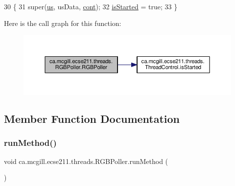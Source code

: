 \begin{DoxyCode}
30                                                                                                      \{
31     super(\hyperlink{classca_1_1mcgill_1_1ecse211_1_1threads_1_1_light_poller_ab6a9cb770bbf71f586697633db1475ff}{us}, usData, \hyperlink{classca_1_1mcgill_1_1ecse211_1_1threads_1_1_light_poller_ab6a9050ced4f6940add4735c8872194a}{cont});
32     \hyperlink{classca_1_1mcgill_1_1ecse211_1_1threads_1_1_thread_control_a92f4933511db42476e39956246bcf2fe}{isStarted} = \textcolor{keyword}{true};
33   \}
\end{DoxyCode}
Here is the call graph for this function\+:
\nopagebreak
\begin{figure}[H]
\begin{center}
\leavevmode
\includegraphics[width=350pt]{classca_1_1mcgill_1_1ecse211_1_1threads_1_1_r_g_b_poller_a7e23e2fe527b2ecbf4ddc8f988dd70a5_cgraph}
\end{center}
\end{figure}


\subsection{Member Function Documentation}
\mbox{\label{classca_1_1mcgill_1_1ecse211_1_1threads_1_1_r_g_b_poller_a96db4561c87136de5098497fe30356fe}} 
\subsubsection{\texorpdfstring{run\+Method()}{runMethod()}}
{\footnotesize\ttfamily void ca.\+mcgill.\+ecse211.\+threads.\+R\+G\+B\+Poller.\+run\+Method (\begin{DoxyParamCaption}{ }\end{DoxyParamCaption})\hspace{0.3cm}{\ttfamily [protected]}}



